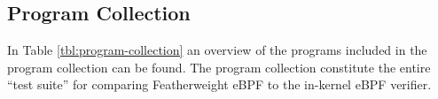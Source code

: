 \subsection{Program Collection}
\label{subsec:program_collection}


In Table \ref{tbl:program-collection} an overview of the programs included in the program collection can be found. The program collection constitute the entire ``test suite'' for comparing Featherweight eBPF to the in-kernel eBPF verifier.

